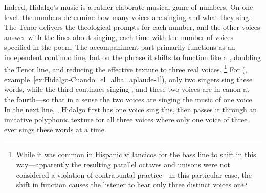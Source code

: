 %	

Indeed, Hidalgo's music is a rather elaborate musical game of numbers.
On one level, the numbers determine how many voices are singing and what they sing. 
The Tenor delivers the theological prompts for each number, and the other voices answer with the lines about singing, each time with the number of voices specified in the poem.
The accompaniment part primarily functions as an independent continuo line, but on the phrase  it shifts to function like a , doubling the Tenor line, and reducing the effective texture to three real voices.%
	\footnote{%
While it was common in Hispanic villancicos for the bass line to shift in this way---apparently the resulting parallel octaves and unisons were not considered a violation of contrapuntal practice---in this particular case, the shift in function causes the listener to hear only three distinct voices on 
	}
For  (, example~\ref{ex:Hidalgo-Cuando_el_alba_aplaude-1}), only two singers sing these words, while the third continues singing ; and these two voices are in canon at the fourth---so that in a sense the two voices are singing the music of one voice.
In the next line, , Hidalgo first has one voice sing this, then passes it through an imitative polyphonic texture for all three voices where only one voice of three ever sings these words at a time.

